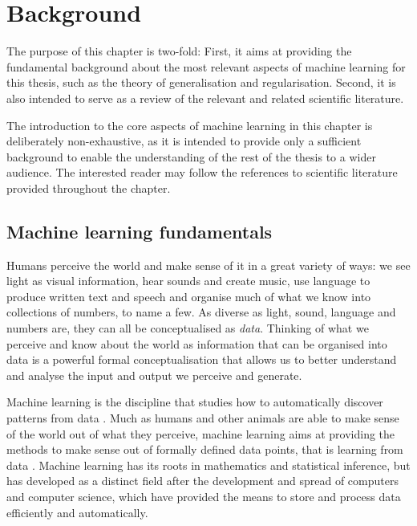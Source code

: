 {
\chapter{Background}
\label{ch:background}
\renewcommand{\chapterpath}{includes/background}
The purpose of this chapter is two-fold: First, it aims at providing the fundamental background about the most relevant aspects of machine learning for this thesis, such as the theory of generalisation and regularisation. Second, it is also intended to serve as a review of the relevant and related scientific literature.

The introduction to the core aspects of machine learning in this chapter is deliberately non-exhaustive, as it is intended to provide only a sufficient background to enable the understanding of the rest of the thesis to a wider audience. The interested reader may follow the references to scientific literature provided throughout the chapter.

\section{Machine learning fundamentals}
Humans perceive the world and make sense of it in a great variety of ways: we see light as visual information, hear sounds and create music, use language to produce written text and speech and organise much of what we know into collections of numbers, to name a few. As diverse as light, sound, language and numbers are, they can all be conceptualised as \textit{data}. Thinking of what we perceive and know about the world as information that can be organised into data is a powerful formal conceptualisation that allows us to better understand and analyse the input and output we perceive and generate.

Machine learning is the discipline that studies how to automatically discover patterns from data \citep{murphy2012machinelearning}. Much as humans and other animals are able to make sense of the world out of what they perceive, machine learning aims at providing the methods to make sense out of formally defined data points, that is learning from data \citep{abu2012learningfromdata}. Machine learning has its roots in mathematics and statistical inference, but has developed as a distinct field after the development and spread of computers and computer science, which have provided the means to store and process data efficiently and automatically. 

}
